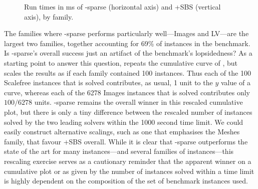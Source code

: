 \begin{figure}[htb]
    \caption{Run times in ms of \McSplit-sparse (horizontal axis) and \kDown+SBS (vertical axis), by family.}
    \label{figure:mcsplit-sparse-scatter-by-family}
\end{figure}

The families where \McSplit-sparse performs particularly well---Images and LV---are
the largest two families, together accounting for 69\% of instances in the benchmark.
Is \McSplit-sparse's overall success just an artifact of the benchmark's
lopsidedness?  As a starting point to answer this question,
repeats the cumulative curve of
, but scales the results as if each family
contained 100 instances.  Thus each
of the 100 Scalefree instances that is solved contributes, as usual, 1 unit to the
$y$ value of a curve, whereas each of the 6278 Images instances that is solved
contributes only $100/6278$ units.
\McSplit-sparse remains the overall winner in this rescaled cumulative plot,
but there is only a tiny difference between the rescaled number of instances
solved by the two leading solvers within the 1000 second time limit.
We could easily construct alternative scalings, such as one that emphasises
the Meshes family, that favour \kDown+SBS overall.
While it is clear that \McSplit-sparse outperforms the state of the art
for many instances---and several families of instances---this rescaling
exercise serves as a cautionary reminder that the apparent winner
on a cumulative plot or as given by the number of instances solved within
a time limit is highly dependent on the composition of the set of
benchmark instances used.

